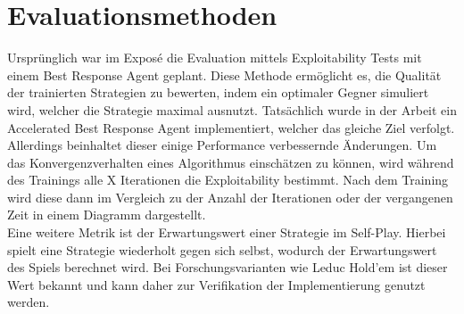 \section{Evaluationsmethoden}
Ursprünglich war im Exposé die Evaluation mittels Exploitability Tests mit einem Best Response Agent geplant.
Diese Methode ermöglicht es, die Qualität der trainierten Strategien zu bewerten, indem ein optimaler Gegner simuliert wird, welcher die Strategie maximal ausnutzt.
Tatsächlich wurde in der Arbeit ein Accelerated Best Response Agent implementiert, welcher das gleiche Ziel verfolgt.
Allerdings beinhaltet dieser einige Performance verbessernde Änderungen. 
Um das Konvergenzverhalten eines Algorithmus einschätzen zu können, wird während des Trainings alle X Iterationen die Exploitability bestimmt.
Nach dem Training wird diese dann im Vergleich zu der Anzahl der Iterationen oder der vergangenen Zeit in einem Diagramm dargestellt.\\
Eine weitere Metrik ist der Erwartungswert einer Strategie im Self-Play.
Hierbei spielt eine Strategie wiederholt gegen sich selbst, wodurch der Erwartungswert des Spiels berechnet wird.
Bei Forschungsvarianten wie Leduc Hold'em ist dieser Wert bekannt und kann daher zur Verifikation der Implementierung genutzt werden.